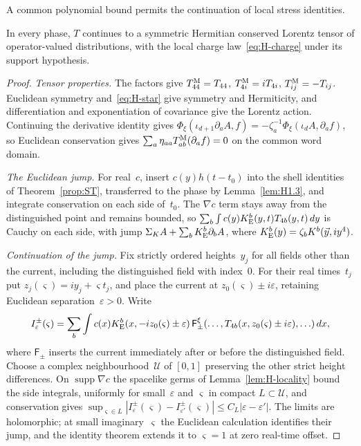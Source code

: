 A common polynomial bound permits the continuation of local stress identities.
\begin{lemma}\label{lem:H2.4}
In every phase, $T$ continues to a symmetric Hermitian conserved Lorentz tensor of operator-valued distributions, with the local charge law~\eqref{eq:H-charge} under its support hypothesis.
\end{lemma}
\begin{proof}
\emph{Tensor properties.} The factors give $T^{\rm M}_{44}=T_{44}$, $T^{\rm M}_{4i}=iT_{4i}$, $T^{\rm M}_{ij}=-T_{ij}$. Euclidean symmetry and~\eqref{eq:H-star} give symmetry and Hermiticity, and differentiation and exponentiation of covariance give the Lorentz action. Continuing the derivative identity gives $\Phi_\xi(\iota_{d+1}\partial_a A,f)=-\zeta_a^{-1}\Phi_\xi(\iota_dA,\partial_af)$, so Euclidean conservation gives $\sum_a\eta_{aa}T^{\rm M}_{ab}(\partial_af)=0$ on the common word domain.

\emph{The Euclidean jump.} For real~$c$, insert $c(y)h(t-t_0)$ into the shell identities of Theorem~\ref{prop:ST}, transferred to the phase by Lemma~\ref{lem:H1.3}, and integrate conservation on each side of~$t_0$. The $\nabla c$ term stays away from the distinguished point and remains bounded, so $\sum_b\int c(y)K_{\rm E}^b(y,t)T_{4b}(y,t)\,dy$ is Cauchy on each side, with jump $\Sigma_KA+\sum_bK_{\rm E}^b\partial_bA$, where $K_{\rm E}^b(y)=\zeta_bK^b(\vec y,iy^4)$.

\emph{Continuation of the jump.} Fix strictly ordered heights~$y_j$ for all fields other than the current, including the distinguished field with index~$0$. For their real times~$t_j$ put $z_j(\varsigma)=iy_j+\varsigma t_j$, and place the current at $z_0(\varsigma)\pm i\varepsilon$, retaining Euclidean separation~$\varepsilon>0$. Write
\begin{equation*}
I_\varepsilon^\pm(\varsigma)=\sum_b\int c(x)K_{\rm E}^b(x,-iz_0(\varsigma)\pm\varepsilon)
\,\mathsf F_{\pm}^\xi(\ldots,T_{4b}(x,z_0(\varsigma)\pm i\varepsilon),\ldots)\,dx,
\end{equation*}
where $\mathsf F_\pm$ inserts the current immediately after or before the distinguished field. Choose a complex neighbourhood~$\mathcal U$ of $[0,1]$ preserving the other strict height differences. On $\operatorname{supp}\nabla c$ the spacelike germs of Lemma~\ref{lem:H-locality} bound the side integrals, uniformly for small~$\varepsilon$ and $\varsigma$ in compact $L\subset\mathcal U$, and conservation gives $\sup_{\varsigma\in L}|I_\varepsilon^\pm(\varsigma)-I_{\varepsilon'}^\pm(\varsigma)|\le C_L|\varepsilon-\varepsilon'|$. The limits are holomorphic; at small imaginary~$\varsigma$ the Euclidean calculation identifies their jump, and the identity theorem extends it to $\varsigma=1$ at zero real-time offset.


\end{proof}
